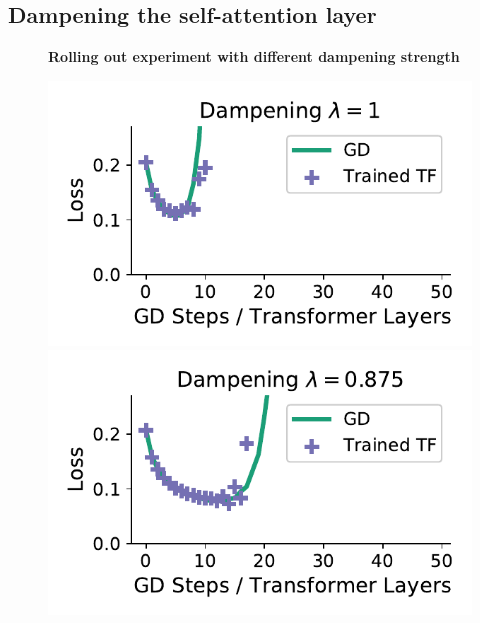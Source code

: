 \documentclass{article}
\theoremstyle{plain}
\theoremstyle{definition}
\theoremstyle{remark}
\begin{document}
\subsection{Dampening the self-attention layer}
\label{app:dampening}


\begin{figure}
\textbf{Rolling out experiment with different dampening strength}
\begin{center}
\begin{minipage}{.30\textwidth}
  \centering
  \begin{center}
    \includegraphics[width=1.\textwidth]{Final_figures/linear/rolling_out/train_17.pdf}
  \end{center}
  \vspace{-10pt}
\end{minipage}
\begin{minipage}{.30\textwidth}
  \centering
  \begin{center}
    \includegraphics[width=1.\textwidth]{Final_figures/linear/rolling_out/train_16.pdf}

\end{center}
\end{minipage}
\end{center}
\end{figure}
\end{document}
